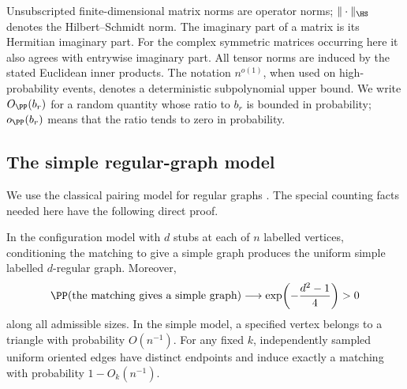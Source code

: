 Unsubscripted finite-dimensional matrix norms are operator norms;
\(\|\cdot\|_{\HS}\) denotes the Hilbert--Schmidt norm.
The imaginary part of a matrix is its Hermitian imaginary part.
For the complex symmetric matrices occurring here it also agrees with
entrywise imaginary part.
All tensor norms are induced by the stated Euclidean inner products.
The notation \(n^{o(1)}\), when used on high-probability events, denotes a
deterministic subpolynomial upper bound.
We write \(O_{\PP}(b_r)\) for a random quantity whose ratio to \(b_r\) is
bounded in probability; \(o_{\PP}(b_r)\) means that the ratio tends
to zero in probability.

\subsection{The simple regular-graph model}

We use the classical pairing model for regular graphs
\cite{BollobasPairing}. The special counting facts needed here have
the following direct proof.

\begin{lemma}\label{lem:model}
In the configuration model with \(d\) stubs at each of \(n\) labelled
vertices, conditioning the matching to give a simple graph produces the
uniform simple labelled \(d\)-regular graph. Moreover,
\[
 \PP(\text{the matching gives a simple graph})
       \longrightarrow \exp\!\left(-\frac{d^2-1}{4}\right)>0
\]
along all admissible sizes.
In the simple model, a specified vertex belongs to a triangle with
probability \(O(n^{-1})\).
For any fixed \(k\), independently sampled uniform oriented edges have
distinct endpoints and induce exactly a matching with probability
\(1-O_k(n^{-1})\).
\end{lemma}

